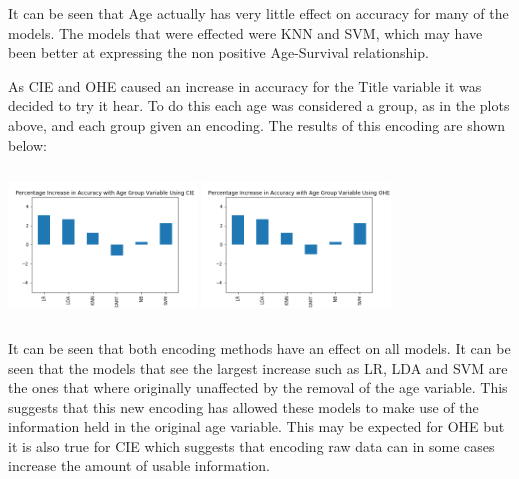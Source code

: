 \documentclass{article}
\begin{document}
\par
It can be seen that Age actually has very little effect on accuracy for many of the models. The models that were effected were KNN and SVM, which may have been better at expressing the non positive Age-Survival relationship.
\par
As CIE and OHE caused an increase in accuracy for the Title variable it was decided to try it hear. To do this each age was considered a group, as in the plots above, and each group given an encoding. The results of this encoding are shown below:
\par
\includegraphics[width=5cm, height=4cm]{Percentage_Increase_in_Accuracy_with_Age_Group_Variable_Using_CIE}
\includegraphics[width=5cm, height=4cm]{Percentage_Increase_in_Accuracy_with_Age_Group_Variable_Using_OHE}
\par
It can be seen that both encoding methods have an effect on all models. It can be seen that the models that see the largest increase such as LR, LDA and SVM are the ones that where originally unaffected by the removal of the age variable. This suggests that this new encoding has allowed these models to make use of the information held in the original age variable. This may be expected for OHE but it is also true for CIE which suggests that encoding raw data can in some cases increase the amount of usable information.
\par
\end{document}
